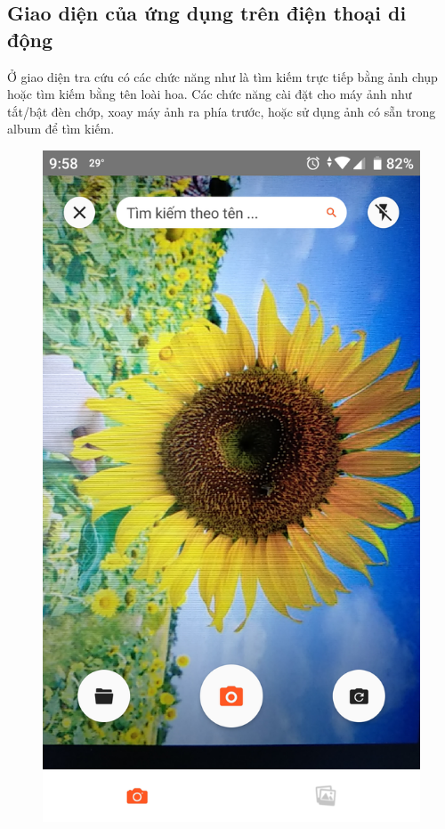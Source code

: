 \documentclass[12pt]{report}
\begin{document}
		\subsection{Giao diện của ứng dụng trên điện thoại di động}
		Ở giao diện tra cứu có các chức năng như là tìm kiếm trực tiếp bằng ảnh chụp hoặc tìm kiếm bằng tên loài hoa. Các chức năng cài đặt cho máy ảnh như tắt/bật đèn chớp, xoay máy ảnh ra phía trước, hoặc sử dụng ảnh có sẵn trong album để tìm kiếm.
				
		\begin{figure}[h]
			\centering
			\includegraphics[scale=0.2]{app_search1}

\end{figure}
\end{document}
